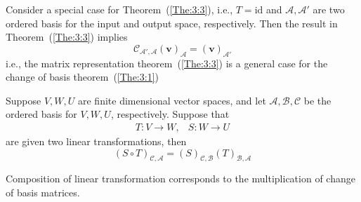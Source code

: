 \begin{remark}
Consider a special case for Theorem~(\ref{The:3:3}), i.e., $T=\text{id}$ and $\mathcal{A},\mathcal{A}'$ are two ordered basis for the input and output space, respectively. Then the result in Theorem~(\ref{The:3:3}) implies
\[
\mathcal{C}_{\mathcal{A}',\mathcal{A}}(\bm v)_{\mathcal{A}}=(\bm v)_{\mathcal{A}'}
\]
i.e., the matrix representation theorem~(\ref{The:3:3}) is a general case for the change of basis theorem~(\ref{The:3:1})
\end{remark}

\begin{proposition}[Functionality]\label{pro:3:6}
Suppose $V,W,U$ are finite dimensional vector spaces,
and let $\mathcal{A},\mathcal{B},\mathcal{C}$ be the ordered basis for $V,W,U$, respectively. 
Suppose that
\[
\begin{array}{ll}
T:V\to W,
&
S:W\to U
\end{array}
\]
are given two linear transformations, then
\[
(S\circ T)_{\mathcal{C},\mathcal{A}}
=
(S)_{\mathcal{C},\mathcal{B}}(T)_{\mathcal{B},\mathcal{A}}
\]

Composition of linear transformation corresponds to the multiplication of change of basis matrices.
\end{proposition}
